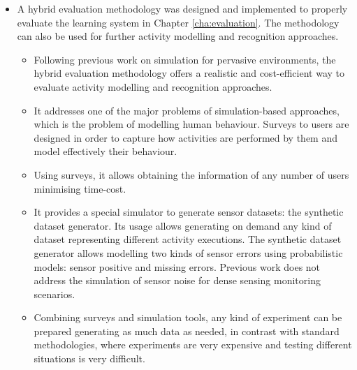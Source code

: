 \begin{itemize}
 \item A hybrid evaluation methodology was designed and implemented to properly evaluate the learning system in Chapter \ref{cha:evaluation}. The methodology can also be used for further activity modelling and recognition approaches. %
 \begin{itemize}
  \item Following previous work on simulation for pervasive environments, the hybrid evaluation methodology offers a realistic and cost-efficient way to evaluate activity modelling and recognition approaches.
  \item It addresses one of the major problems of simulation-based approaches, which is the problem of modelling human behaviour. Surveys to users are designed in order to capture how activities are performed by them and model effectively their behaviour.
  \item Using surveys, it allows obtaining the information of any number of users minimising time-cost.
  \item It provides a special simulator to generate sensor datasets: the synthetic dataset generator. Its usage allows generating on demand any kind of dataset representing different activity executions. The synthetic dataset generator allows modelling two kinds of sensor errors using probabilistic models: sensor positive and missing errors. Previous work does not address the simulation of sensor noise for dense sensing monitoring scenarios.
  \item Combining surveys and simulation tools, any kind of experiment can be prepared generating as much data as needed, in contrast with standard methodologies, where experiments are very expensive and testing different situations is very difficult.
 \end{itemize}

\end{itemize}
